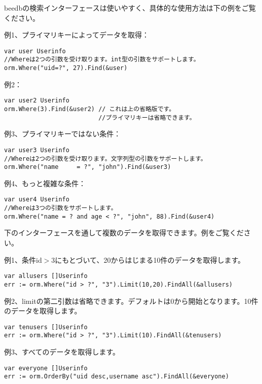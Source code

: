 beedbの検索インターフェースは使いやすく、具体的な使用方法は下の例をご覧ください。

例1、プライマリキーによってデータを取得：

\begin{lstlisting}[numbers=none]
var user Userinfo
//Whereは2つの引数を受け取ります。int型の引数をサポートします。
orm.Where("uid=?", 27).Find(&user)
\end{lstlisting}

例2：

\begin{lstlisting}[numbers=none]
var user2 Userinfo
orm.Where(3).Find(&user2) // これは上の省略版です。
                          //プライマリキーは省略できます。
\end{lstlisting}

例3、プライマリキーではない条件：

\begin{lstlisting}[numbers=none]
var user3 Userinfo
//Whereは2つの引数を受け取ります。文字列型の引数をサポートします。
orm.Where("name     = ?", "john").Find(&user3)
\end{lstlisting}

例4、もっと複雑な条件：

\begin{lstlisting}[numbers=none]
var user4 Userinfo
//Whereは3つの引数をサポートします。
orm.Where("name = ? and age < ?", "john", 88).Find(&user4)
\end{lstlisting}

下のインターフェースを通して複数のデータを取得できます。例をご覧ください。

例1、条件id$>$3にもとづいて、20からはじまる10件のデータを取得します。


\begin{lstlisting}[numbers=none]
var allusers []Userinfo
err := orm.Where("id > ?", "3").Limit(10,20).FindAll(&allusers)
\end{lstlisting}

例2、limitの第二引数は省略できます。デフォルトは0から開始となります。10件のデータを取得します。

\begin{lstlisting}[numbers=none]
var tenusers []Userinfo
err := orm.Where("id > ?", "3").Limit(10).FindAll(&tenusers)
\end{lstlisting}

例3、すべてのデータを取得します。

\begin{lstlisting}[numbers=none]
var everyone []Userinfo
err := orm.OrderBy("uid desc,username asc").FindAll(&everyone)
\end{lstlisting}

